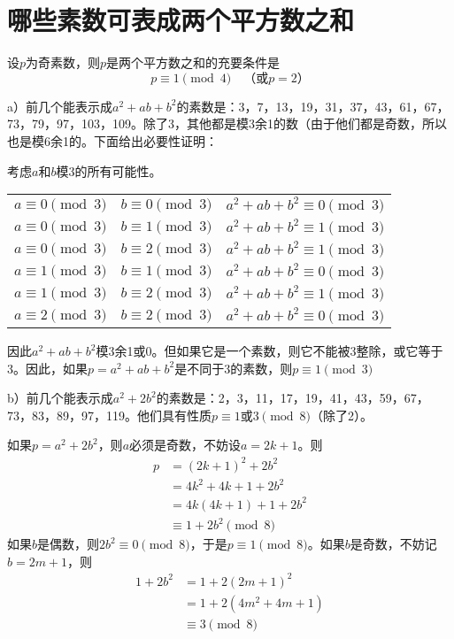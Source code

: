 \chapter{哪些素数可表成两个平方数之和}
\begin{theorem}[素数的两个平方数之和定理]
设$p$为奇素数，则$p$是两个平方数之和的充要条件是
\[p\equiv1\pmod4\quad\text{（或$p=2$）}\]
\end{theorem}
%
\exercise a）前几个能表示成$a^2+ab+b^2$的素数是：3，7，13，19，31，37，43，61，67，73，79，97，103，109。除了3，其他都是模3余1的数（由于他们都是奇数，所以也是模6余1的。下面给出必要性证明：\par
考虑$a$和$b$模3的所有可能性。
\begin{center}
\begin{tabular}{lll}
$a\equiv0\pmod3$ & $b\equiv0\pmod3$ & $a^2+ab+b^2\equiv0\pmod3$ \\
$a\equiv0\pmod3$ & $b\equiv1\pmod3$ & $a^2+ab+b^2\equiv1\pmod3$ \\
$a\equiv0\pmod3$ & $b\equiv2\pmod3$ & $a^2+ab+b^2\equiv1\pmod3$ \\
$a\equiv1\pmod3$ & $b\equiv1\pmod3$ & $a^2+ab+b^2\equiv0\pmod3$ \\
$a\equiv1\pmod3$ & $b\equiv2\pmod3$ & $a^2+ab+b^2\equiv1\pmod3$ \\
$a\equiv2\pmod3$ & $b\equiv2\pmod3$ & $a^2+ab+b^2\equiv0\pmod3$ \\
\end{tabular}
\end{center}
因此$a^2+ab+b^2$模3余1或0。但如果它是一个素数，则它不能被3整除，或它等于3。因此，如果$p=a^2+ab+b^2$是不同于3的素数，则$p\equiv1\pmod3$\par
b）前几个能表示成$a^2+2b^2$的素数是：2，3，11，17，19，41，43，59，67，73，83，89，97，119。他们具有性质$p\equiv1$或$3\pmod8$（除了2）。\par
\proof 如果$p=a^2+2b^2$，则$a$必须是奇数，不妨设$a=2k+1$。则
\begin{align*}
p&=(2k+1)^2+2b^2\\
&=4k^2+4k+1+2b^2\\
&=4k(4k+1)+1+2b^2\\
&\equiv1+2b^2\pmod8
\end{align*}
如果$b$是偶数，则$2b^2\equiv0\pmod8$，于是$p\equiv1\pmod8$。如果$b$是奇数，不妨记$b=2m+1$，则
\begin{align*}
1+2b^2&=1+2(2m+1)^2\\
&=1+2(4m^2+4m+1)\\
&\equiv3\pmod8
\end{align*}
